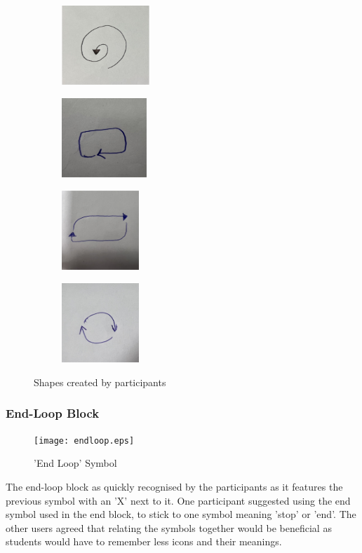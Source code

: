 \documentclass[oneside,%
                    author={Malak Hajji},
                    degree={BSc},
                    title={Designing An Accessible Computational Toolkit For Students},
                  subtitle={With Mixed Visual Abilities}]{dissertation}
\begin{document}
\FloatBarrier
\begin{figure}[h]
\centering
\begin{subfigure}{.2\textwidth}
  \centering
  \includegraphics[width=\textwidth,height=3cm]{thesis/spiral.eps}
  \caption{}
  \label{fig:sub1}
\end{subfigure}%
\begin{subfigure}{.2\textwidth}
  \centering
  \includegraphics[width=\textwidth,height=3cm]{thesis/spotify.eps}
  \caption{} 
  \label{fig:sub2}
\end{subfigure}%
\begin{subfigure}{.2\textwidth}
  \centering
  \includegraphics[width=\textwidth,height=3cm]{thesis/repeat2.eps}
  \caption{}
  \label{fig:sub3}
\end{subfigure}%
\begin{subfigure}{.2\textwidth}
  \centering
  \includegraphics[width=\textwidth,height=3cm]{thesis/repeat.eps}
  \caption{}
  \label{fig:sub4}
\end{subfigure}
\caption{Shapes created by participants}
\label{fig:test}
\end{figure}
\FloatBarrier
\subsubsection{End-Loop Block}
\FloatBarrier
\begin{figure}[h]
    \centering
    \texttt{[image: endloop.eps]}
    \caption{'End Loop' Symbol}
    \label{fig-endloop}
\end{figure}
\FloatBarrier
The end-loop block as quickly recognised by the participants as it features the previous symbol with an 'X' next to it. One participant suggested using the end symbol used in the end block, to stick to one symbol meaning 'stop' or 'end'. The other users agreed that relating the symbols together would be beneficial as students would have to remember less icons and their meanings.
\end{document}
